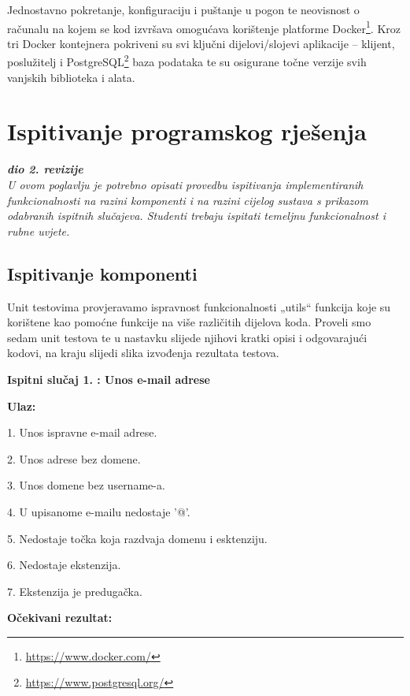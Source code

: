 Jednostavno pokretanje, konfiguraciju i puštanje u pogon te neovisnost o računalu na kojem se kod izvršava omogućava korištenje platforme Docker\footnote{\url{https://www.docker.com/}}. Kroz tri Docker kontejnera pokriveni su svi ključni dijelovi/slojevi aplikacije – klijent, poslužitelj i PostgreSQL\footnote{\url{https://www.postgresql.org/}} baza podataka te su osigurane točne verzije svih vanjskih biblioteka i alata.


			\eject 
		
	
		\section{Ispitivanje programskog rješenja}
			
			\textbf{\textit{dio 2. revizije}}\\
			
			 \textit{U ovom poglavlju je potrebno opisati provedbu ispitivanja implementiranih funkcionalnosti na razini komponenti i na razini cijelog sustava s prikazom odabranih ispitnih slučajeva. Studenti trebaju ispitati temeljnu funkcionalnost i rubne uvjete.}
	
			
			\subsection{Ispitivanje komponenti}
Unit testovima provjeravamo ispravnost funkcionalnosti „utils“ funkcija koje su korištene kao pomoćne funkcije na više različitih dijelova koda.
Proveli smo sedam unit testova te u nastavku slijede njihovi kratki opisi i odgovarajući kodovi, na kraju slijedi slika izvođenja rezultata testova.

 \textbf{Ispitni slučaj 1. : Unos e-mail adrese}  

                \textbf{Ulaz:}

                1. Unos ispravne e-mail adrese.

                2. Unos adrese bez domene.

                3. Unos domene bez username-a.

                4. U upisanome e-mailu nedostaje '@'.

                5. Nedostaje točka koja razdvaja domenu i esktenziju.

                6. Nedostaje ekstenzija.

                7. Ekstenzija je predugačka.

                \textbf{Očekivani rezultat:}

